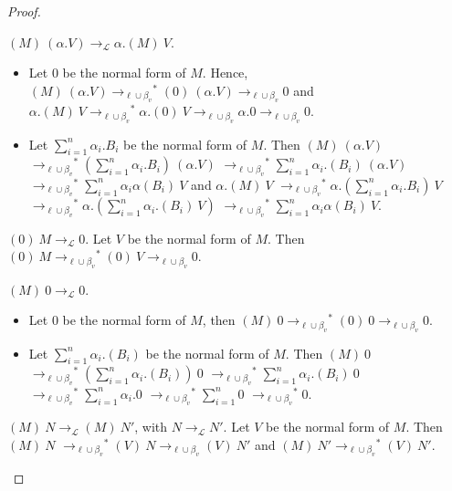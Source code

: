 \documentclass{LMCS}
\newcommand{\xto}[1]{\ensuremath{\rightarrow_{#1}}}
\newcommand{\toolin}{\xto{\mathcal{L}}}
\newcommand{\toblinred}{\xto{\ell\cup\beta_v}}
\newcommand{\stoblinred}{\ensuremath{\xto{\ell\cup\beta_v}^{\ast}}}
\begin{document}
\begin{proof}
\begin{myenumerate}
    \item $(M)~(\alpha.V)\toolin\alpha.(M)~V$.  
      \begin{itemize}
	\item Let $0$ be the normal form of $M$. Hence,
	  $(M)~(\alpha.V)\stoblinred(0)~(\alpha.V)\toblinred 0$
	  and
	  $\alpha.(M)~V\stoblinred\alpha.(0)~V\toblinred\alpha.0\toblinred 0$.
	\item Let $\sum\limits_{i=1}^n\alpha_i.B_i$ be the normal form of $M$. Then 
	  $(M)~(\alpha.V)$
	  $\stoblinred(\sum\limits_{i=1}^n\alpha_i.B_i)~(\alpha.V)$
	  $\stoblinred\sum\limits_{i=1}^n\alpha_i.(B_i)~(\alpha.V)$
	  $\stoblinred\sum\limits_{i=1}^n\alpha_i\alpha(B_i)~V$
	  and
	  $\alpha.(M)~V$
	  $\stoblinred\alpha.(\sum\limits_{i=1}^n\alpha_i.B_i)~V$
	  $\stoblinred\alpha.(\sum\limits_{i=1}^n\alpha_i.(B_i)~V)$
	  $\stoblinred\sum\limits_{i=1}^n\alpha_i\alpha(B_i)~V$.
      \end{itemize}

    \item $(0)~M\toolin 0$. Let $V$ be the normal form of $M$. Then
      $(0)~M\stoblinred (0)~V\toblinred 0$.

    \item $(M)~0\toolin 0$.
      \begin{itemize}
	\item Let $0$ be the normal form of $M$, then
	  $(M)~0\stoblinred(0)~0\toblinred 0$.
	\item Let $\sum\limits_{i=1}^n\alpha_i.(B_i)$ be the normal form of $M$. Then
	  $(M)~0$
	  $\stoblinred(\sum\limits_{i=1}^n\alpha_i.(B_i))~0$
	  $\stoblinred\sum\limits_{i=1}^n\alpha_i.(B_i)~0$
	  $\stoblinred\sum\limits_{i=1}^n\alpha_i.0$
	  $\stoblinred\sum\limits_{i=1}^n 0$
	  $\stoblinred 0$.
      \end{itemize}

    \item $(M)~N\toolin(M)~N'$, with $N\toolin N'$. Let $V$ be the normal form of $M$. Then
      $(M)~N$
      $\stoblinred (V)~N\toblinred (V)~N'$
      and
      $(M)~N'\stoblinred (V)~N'$.
      \qedhere
  \end{myenumerate}
\end{proof}
\end{document}
